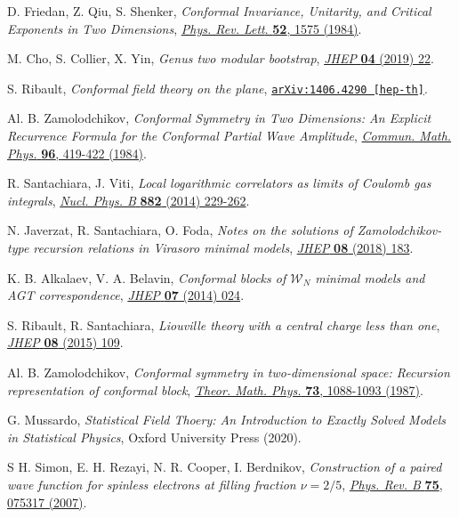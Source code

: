 \documentclass[a4paper,11pt]{article}
\begin{document}
\begin{thebibliography}{99}
 D. Friedan, Z. Qiu, S. Shenker, \emph{Conformal Invariance, Unitarity, and Critical Exponents in Two Dimensions}, \href{https://doi.org/10.1103/PhysRevLett.52.1575}{\emph{Phys. Rev. Lett}. {\bf 52}, 1575 (1984)}.

 M. Cho, S. Collier, X. Yin, \emph{Genus two modular bootstrap}, \href{https://doi.org/10.1007/JHEP04(2019)022}{\emph{JHEP} {\bf 04} (2019) 22}.

 S. Ribault, \emph{Conformal field theory on the plane}, \href{https://arxiv.org/abs/1406.4290}{\texttt{arXiv:1406.4290 [hep-th]}}.

 Al.  B.  Zamolodchikov, \emph{Conformal  Symmetry  in  Two  Dimensions: An  Explicit  Recurrence Formula for the  Conformal Partial  Wave  Amplitude}, \href{https://doi.org/10.1007/BF01214585}{\emph{Commun. Math. Phys.} {\bf 96},  419-422  (1984)}.

 R. Santachiara, J. Viti, \emph{Local logarithmic correlators as limits of Coulomb gas integrals},
\href{https://doi.org/10.1016/j.nuclphysb.2014.02.022}{\emph{Nucl. Phys. B} {\bf 882} (2014) 229-262}.

 N. Javerzat, R. Santachiara, O. Foda, \emph{Notes on the solutions of Zamolodchikov-type recursion relations in Virasoro minimal models}, \href{https://doi.org/10.1007/JHEP08(2018)183}{\emph{JHEP} {\bf 08} (2018) 183}.

 K. B. Alkalaev, V. A. Belavin, \emph{Conformal blocks of $\mathcal{W}_N$
minimal models and AGT correspondence}, \href{https://doi.org/10.1007/JHEP07(2014)024}{\emph{JHEP} {\bf 07} (2014) 024}.

 S. Ribault, R. Santachiara, \textit{Liouville theory with a central charge less than one}, 
\href{https://doi.org/10.1007/JHEP08(2015)109}{\emph{JHEP} {\bf 08} (2015) 109}.

 Al. B. Zamolodchikov, \emph{Conformal symmetry in two-dimensional space: Recursion representation of conformal
block}, \href{https://doi.org/10.1007/BF01022967}{\emph{Theor. Math. Phys.} {\bf 73}, 1088-1093  (1987)}.

 G. Mussardo, \emph{Statistical Field Thoery: An Introduction to Exactly Solved Models in Statistical Physics}, Oxford University Press (2020).

 S H. Simon, E. H. Rezayi, N. R. Cooper, I. Berdnikov, \emph{Construction of a paired wave function for spinless electrons at filling fraction $\nu=2/5$}, \href{https://doi.org/10.1103/PhysRevB.75.075317}{\emph{Phys. Rev. B} {\bf 75}, 075317 (2007)}.


\end{thebibliography}
\end{document}
